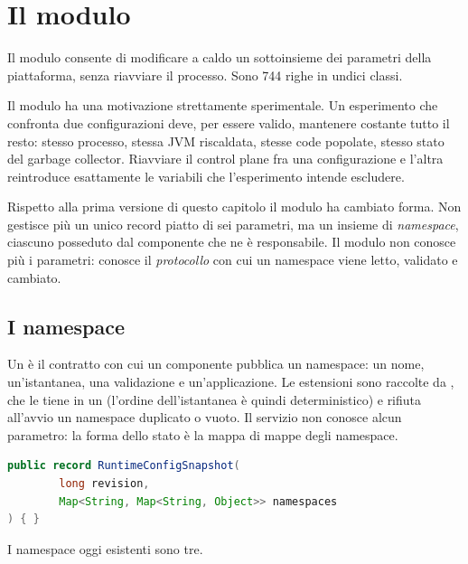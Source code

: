 \chapter{Il modulo }
\label{cap:14-runtime-config}

Il modulo  consente di modificare a caldo un sottoinsieme
dei parametri della piattaforma, senza riavviare il processo. Sono 744 righe in
undici classi.

Il modulo ha una motivazione strettamente sperimentale. Un esperimento che
confronta due configurazioni deve, per essere valido, mantenere costante tutto il
resto: stesso processo, stessa JVM riscaldata, stesse code popolate, stesso stato
del garbage collector. Riavviare il control plane fra una configurazione e
l'altra reintroduce esattamente le variabili che l'esperimento intende
escludere.

Rispetto alla prima versione di questo capitolo il modulo ha cambiato forma.
Non gestisce pi\`u un unico record piatto di sei parametri, ma un insieme di
\emph{namespace}, ciascuno posseduto dal componente che ne \`e responsabile. Il
modulo non conosce pi\`u i parametri: conosce il \emph{protocollo} con cui un
namespace viene letto, validato e cambiato.

\section{I namespace}

Un  \`e il contratto con cui un componente pubblica
un namespace: un nome, un'istantanea, una validazione e un'applicazione. Le
estensioni sono raccolte da , che le tiene in un
 (l'ordine dell'istantanea \`e quindi deterministico) e rifiuta
all'avvio un namespace duplicato o vuoto. Il servizio non conosce alcun
parametro: la forma dello stato \`e la mappa di mappe degli
namespace.

\begin{lstlisting}[language=Java]
public record RuntimeConfigSnapshot(
        long revision,
        Map<String, Map<String, Object>> namespaces
) { }
\end{lstlisting}

I namespace oggi esistenti sono tre.

